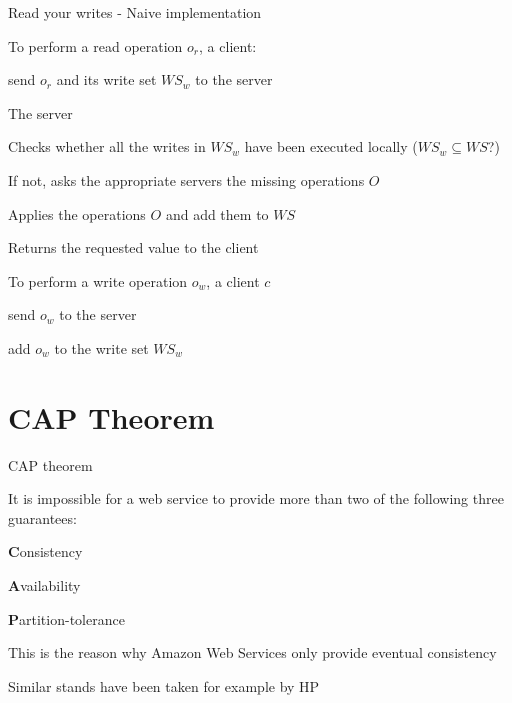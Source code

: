 \begin{frame}{Read your writes - Naive implementation}

\BIL
\item To perform a read operation $o_r$, a client:
	\BI
	\item send $o_r$ and its write set $\mathit{WS}_w$ to the server
	\EI
\item The server
\BI
\item Checks whether all the writes in $\mathit{WS}_w$ have been executed locally ($\mathit{WS}_w \subseteq \mathit{WS}$?)
\item If not, asks the appropriate servers the missing operations $O$
\item Applies the operations $O$ and add them to $\mathit{WS}$
\item Returns the requested value to the client
\EI
\item To perform a write operation $o_w$, a client $c$
	\BI
	\item send $o_w$ to the server
	\item add $o_w$ to the write set $\mathit{WS}_w$
	\EI
\EIL

\end{frame}

\section{CAP Theorem}

\begin{frame}{CAP theorem}
	
\begin{theorem}	
It is impossible for a web service to provide more than two of the following three guarantees:
\BI
\item \textbf{C}onsistency
\item \textbf{A}vailability
\item \textbf{P}artition-tolerance	
\EI
\end{theorem}

\smallskip
\BIL
\item This is the reason why Amazon Web Services only provide eventual
consistency
	\BI
	\item {\footnotesize {}}
	\EI 
\item Similar stands have been taken for example by HP
	\BI
	\item {\footnotesize {}}
	\EI
\EI


\end{frame}

